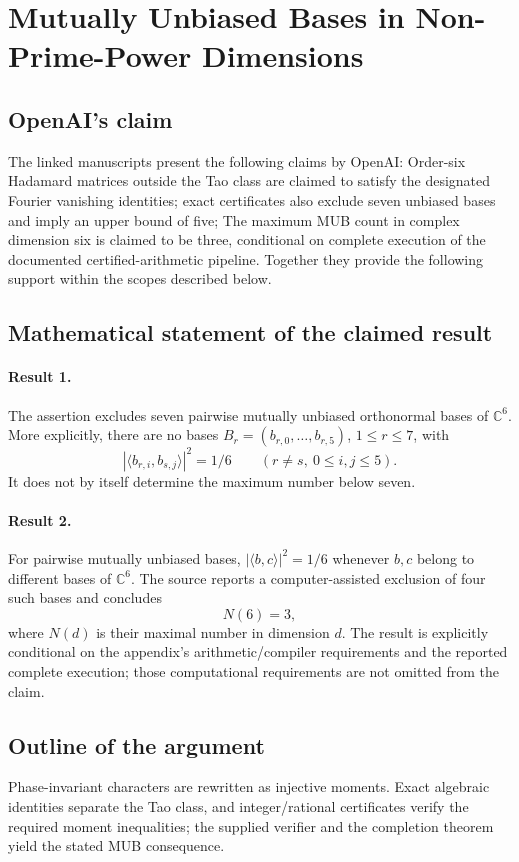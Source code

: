 \documentclass[11pt]{article}
\begin{document}
\section*{Mutually Unbiased Bases in Non-Prime-Power Dimensions}

\subsection{OpenAI's claim}
The linked manuscripts present the following claims by OpenAI: Order-six Hadamard matrices outside the Tao class are claimed to satisfy the designated Fourier vanishing identities; exact certificates also exclude seven unbiased bases and imply an upper bound of five; The maximum MUB count in complex dimension six is claimed to be three, conditional on complete execution of the documented certified-arithmetic pipeline. Together they provide the following support within the scopes described below.

\subsection{Mathematical statement of the claimed result}
\paragraph{Result 1.} The assertion excludes seven pairwise mutually unbiased orthonormal bases of \(\mathbb C^6\). More explicitly, there are no bases \(B_r=(b_{r,0},\ldots,b_{r,5})\), \(1\le r\le7\), with
\[
 |\langle b_{r,i},b_{s,j}\rangle|^2=1/6
 \qquad(r\ne s,\ 0\le i,j\le5).
\]
It does not by itself determine the maximum number below seven.

\paragraph{Result 2.} For pairwise mutually unbiased bases, \(|\langle b,c\rangle|^2=1/6\) whenever \(b,c\) belong to different bases of \(\mathbb C^6\). The source reports a computer-assisted exclusion of four such bases and concludes
\[
 N(6)=3,
\]
where \(N(d)\) is their maximal number in dimension \(d\). The result is explicitly conditional on the appendix's arithmetic/compiler requirements and the reported complete execution; those computational requirements are not omitted from the claim.

\subsection{Outline of the argument}
Phase-invariant characters are rewritten as injective moments. Exact algebraic identities separate the Tao class, and integer/rational certificates verify the required moment inequalities; the supplied verifier and the completion theorem yield the stated MUB consequence.
\end{document}
